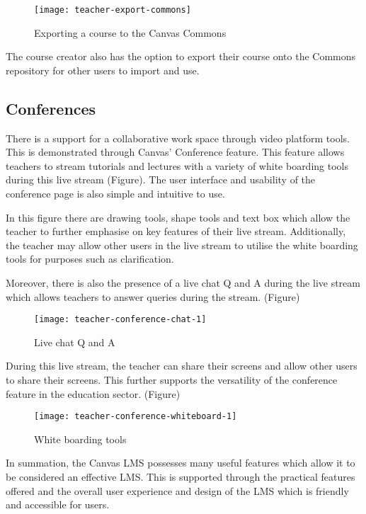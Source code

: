 \begin{figure}[h!]
\centering
\texttt{[image: teacher-export-commons]}
\caption{Exporting a course to the Canvas Commons}
\end{figure}

The course creator also has the option to export their course onto the Commons repository for other users to import and use. 

\clearpage
 
\subsection{Conferences}
There is a support for a collaborative work space through video platform tools. This is demonstrated through Canvas’ Conference feature. This feature allows teachers to stream tutorials and lectures with a variety of white boarding tools during this live stream (Figure). The user interface and usability of the conference page is also simple and intuitive to use.

In this figure there are drawing tools, shape tools and text box which allow the teacher to further emphasise on key features of their live stream. Additionally, the teacher may allow other users in the live stream to utilise the white boarding tools for purposes such as clarification. 

Moreover, there is also the presence of a live chat Q and A during the live stream which allows teachers to answer queries during the stream. (Figure)

\begin{figure}[h!]
\centering
\texttt{[image: teacher-conference-chat-1]}
\caption{Live chat Q and A}
\end{figure}

During this live stream, the teacher can share their screens and allow other users to share their screens. This further supports the versatility of the conference feature in the education sector. (Figure)

\begin{figure}[h!]
\centering
\texttt{[image: teacher-conference-whiteboard-1]}
\caption{White boarding tools}
\end{figure}

In summation, the Canvas LMS possesses many useful features which allow it to be considered an effective LMS. This is supported through the practical features offered and the overall user experience and design of the LMS which is friendly and accessible for users. 
